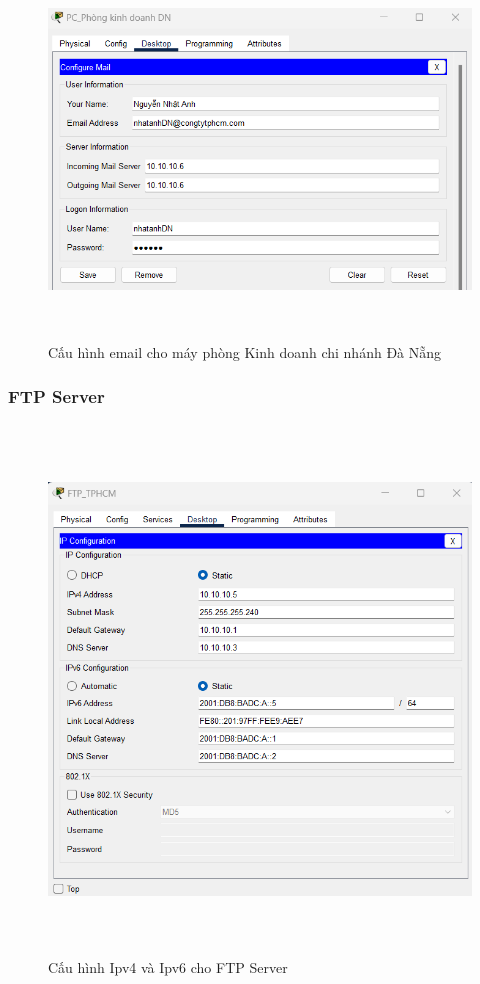 \documentclass[12pt,a4paper]{report}
\begin{document}
\begin{figure}[H]
    \centering
    \includegraphics[width=16cm, height=10cm]{img/Mail_Server3.png}
    \caption{Cấu hình email cho máy phòng Kinh doanh chi nhánh Đà Nẵng}
    \label{hinh422c}
\end{figure}



\subsubsection{FTP Server}
\begin{figure}[H]
    \centering
    \includegraphics[width=16cm, height=14cm]{img/FTP_Server1.png}
    \caption{Cấu hình Ipv4 và Ipv6 cho FTP Server}
    \label{hinh423a}
\end{figure}
\end{document}
